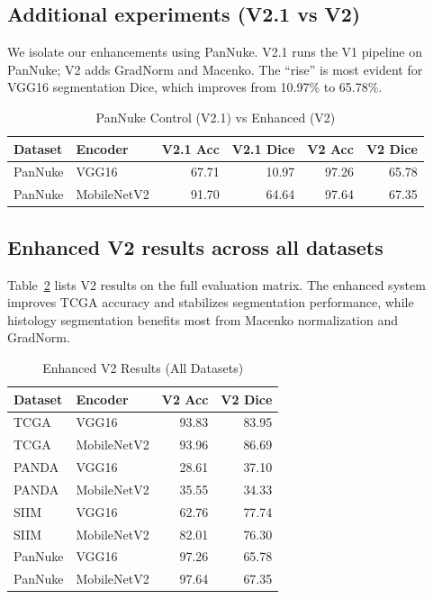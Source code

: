 \documentclass[conference,a4paper]{IEEEtran}
\begin{document}
\subsection{Additional experiments (V2.1 vs V2)}
We isolate our enhancements using PanNuke. V2.1 runs the V1 pipeline on PanNuke; V2 adds GradNorm and Macenko. The ``rise'' is most evident for VGG16 segmentation Dice, which improves from 10.97\% to 65.78\%.

\begin{table}[t]
\centering
\caption{PanNuke Control (V2.1) vs Enhanced (V2)}
\label{tab:pannuke}
\begin{tabular}{l l r r r r}
\toprule
Dataset & Encoder & V2.1 Acc & V2.1 Dice & V2 Acc & V2 Dice \\
\midrule
PanNuke & VGG16 & 67.71 & 10.97 & 97.26 & 65.78 \\
PanNuke & MobileNetV2 & 91.70 & 64.64 & 97.64 & 67.35 \\
\bottomrule
\end{tabular}
\end{table}

\subsection{Enhanced V2 results across all datasets}
Table~\ref{tab:v2all} lists V2 results on the full evaluation matrix. The enhanced system improves TCGA accuracy and stabilizes segmentation performance, while histology segmentation benefits most from Macenko normalization and GradNorm.

\begin{table}[t]
\centering
\caption{Enhanced V2 Results (All Datasets)}
\label{tab:v2all}
\begin{tabular}{l l r r}
\toprule
Dataset & Encoder & V2 Acc & V2 Dice \\
\midrule
TCGA & VGG16 & 93.83 & 83.95 \\
TCGA & MobileNetV2 & 93.96 & 86.69 \\
PANDA & VGG16 & 28.61 & 37.10 \\
PANDA & MobileNetV2 & 35.55 & 34.33 \\
SIIM & VGG16 & 62.76 & 77.74 \\
SIIM & MobileNetV2 & 82.01 & 76.30 \\
PanNuke & VGG16 & 97.26 & 65.78 \\
PanNuke & MobileNetV2 & 97.64 & 67.35 \\
\bottomrule
\end{tabular}
\end{table}
\end{document}

